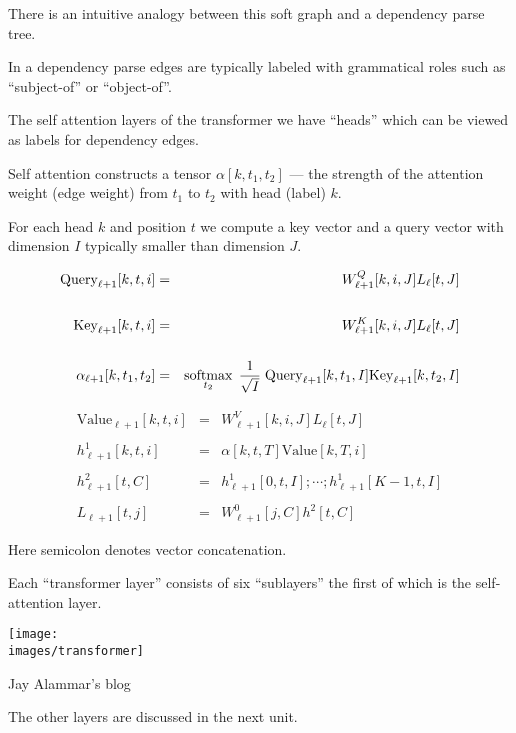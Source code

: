 {\vfill
There is an intuitive analogy between this soft graph and a dependency parse tree.


In a dependency parse edges are typically labeled with grammatical roles such as ``subject-of'' or ``object-of''.

\vfill
The self attention layers of the transformer we have ``heads'' which can be viewed as labels for dependency edges.

\vfill
Self attention constructs a tensor $\alpha[k,t_1,t_2]$ --- the strength of the attention weight (edge weight)
from $t_1$ to $t_2$ with head (label) $k$.


For each head $k$ and position $t$ we compute a key vector and a query vector with dimension $I$ typically smaller than dimension $J$.

\begin{eqnarray*}
\mathrm{Query}_{\ell+1}[k,t,i] & = & W^Q_{\ell+1}[k,i,J]L_\ell[t,J] \\
\\
\mathrm{Key}_{\ell+1}[k,t,i] & = &  W^K_{\ell+1}[k,i,J]L_\ell[t,J] \\
\\
\alpha_{\ell+1}[k,t_1,t_2] & = & \operatorname*{softmax}_{t_2}\; \frac{1}{\sqrt{I}}\;\mathrm{Query}_{\ell+1}[k,t_1,I]\mathrm{Key}_{\ell+1}[k,t_2,I]
\end{eqnarray*}

      
\begin{eqnarray*}
\mathrm{Value}_{\ell+1}[k,t,i] & = & W^V_{\ell+1}[k,i,J]L_\ell[t,J] \\
\\
h^1_{\ell+1}[k,t,i] & = & \alpha[k,t,T]\mathrm{Value}[k,T,i] \\
\\
h^2_{\ell+1}[t,C] & = & h^1_{\ell+1}[0,t,I];\cdots;h^1_{\ell+1}[K-1,t,I] \\
\\
L_{\ell+1}[t,j] & = & W^0_{\ell+1}[j,C]h^2[t,C]
\end{eqnarray*}

\vfill
Here semicolon denotes vector concatenation.


Each ``transformer layer'' consists of six ``sublayers'' the first of which is the self-attention layer.


\centerline{\texttt{[image: \\images/transformer]}}

{\Large
\centerline{Jay Alammar's blog}
}

The other layers are discussed in the next unit.


}

